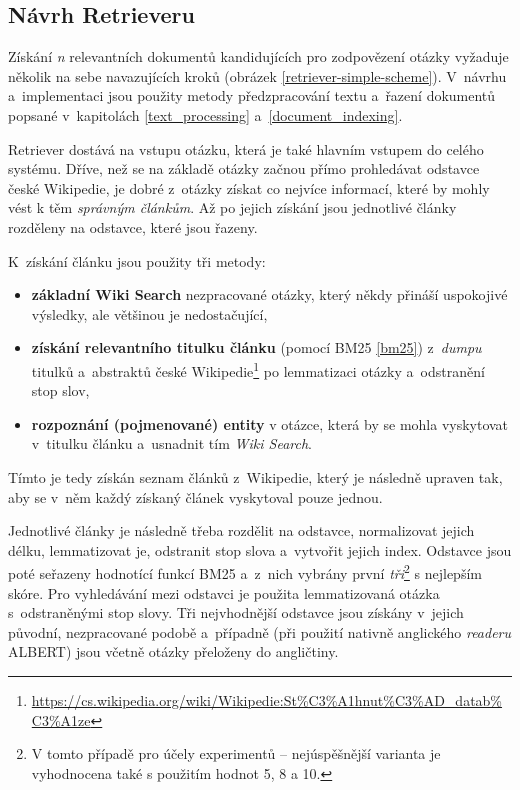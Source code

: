 \subsection{Návrh Retrieveru}
Získání \emph{n} relevantních dokumentů kandidujících pro zodpovězení otázky vyžaduje několik na sebe navazujících kroků (obrázek \ref{retriever-simple-scheme}). V~návrhu a~implementaci jsou použity metody předzpracování textu a~řazení dokumentů popsané v~kapitolách \ref{text_processing} a~\ref{document_indexing}.\par
Retriever dostává na vstupu otázku, která je také hlavním vstupem do celého systému. Dříve, než se na základě otázky začnou přímo prohledávat odstavce české Wikipedie, je dobré z~otázky získat co nejvíce informací, které by mohly vést k těm \emph{správným článkům}. Až po jejich získání jsou jednotlivé články rozděleny na odstavce, které jsou řazeny.\par
\noindent K~získání článku jsou použity tři metody:
\begin{itemize}
    \item \textbf{základní Wiki Search} nezpracované otázky, který někdy přináší uspokojivé výsledky, ale většinou je nedostačující,
    \item \textbf{získání relevantního titulku článku} (pomocí BM25 \ref{bm25}) z~\emph{dumpu} titulků a~abstraktů české Wikipedie\footnote{\url{https://cs.wikipedia.org/wiki/Wikipedie:St\%C3\%A1hnut\%C3\%AD_datab\%C3\%A1ze}} po lemmatizaci otázky a~odstranění stop slov,
    \item \textbf{rozpoznání (pojmenované) entity} v otázce, která by se mohla vyskytovat v~titulku článku a~usnadnit tím \emph{Wiki Search}.
\end{itemize}
Tímto je tedy získán seznam článků z~Wikipedie, který je následně upraven tak, aby se v~něm každý získaný článek vyskytoval pouze jednou.\par
Jednotlivé články je následně třeba rozdělit na odstavce, normalizovat jejich délku, lemmatizovat je, odstranit stop slova a~vytvořit jejich index. Odstavce jsou poté seřazeny hodnotící funkcí BM25 a~z~nich vybrány první \textit{tři}\footnote{V tomto případě pro účely experimentů -- nejúspěšnější varianta je vyhodnocena také s použitím hodnot 5, 8 a 10.} s nejlepším skóre. Pro vyhledávání mezi odstavci je použita lemmatizovaná otázka s~odstraněnými stop slovy. Tři nejvhodnější odstavce jsou získány v~jejich původní, nezpracované podobě a~případně (při použití nativně anglického \emph{readeru} ALBERT) jsou včetně otázky přeloženy do angličtiny.

